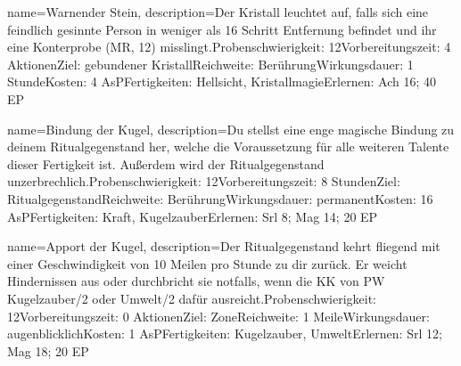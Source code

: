 {
    name={Warnender Stein},
    description={Der Kristall leuchtet auf, falls sich eine feindlich gesinnte Person in weniger als 16 Schritt Entfernung befindet und ihr eine Konterprobe (MR, 12) misslingt.\newline Probenschwierigkeit: 12\newline Vorbereitungszeit: 4 Aktionen\newline Ziel: gebundener Kristall\newline  Reichweite: Berührung\newline Wirkungsdauer: 1 Stunde\newline Kosten: 4 AsP\newline Fertigkeiten: Hellsicht, Kristallmagie\newline Erlernen: Ach 16; 40 EP}
}


{
    name={Bindung der Kugel},
    description={Du stellst eine enge magische Bindung zu deinem Ritualgegenstand her, welche die Voraussetzung für alle weiteren Talente dieser Fertigkeit ist. Außerdem wird der Ritualgegenstand unzerbrechlich.\newline Probenschwierigkeit: 12\newline Vorbereitungszeit: 8 Stunden\newline Ziel: Ritualgegenstand\newline Reichweite: Berührung\newline Wirkungsdauer: permanent\newline Kosten: 16 AsP\newline Fertigkeiten: Kraft, Kugelzauber\newline Erlernen: Srl 8; Mag 14; 20 EP}
}


{
    name={Apport der Kugel},
    description={Der Ritualgegenstand kehrt fliegend mit einer Geschwindigkeit von 10 Meilen pro Stunde zu dir zurück. Er weicht Hindernissen aus oder durchbricht sie notfalls, wenn die KK von PW Kugelzauber/2 oder Umwelt/2 dafür ausreicht.\newline Probenschwierigkeit: 12\newline Vorbereitungszeit: 0 Aktionen\newline Ziel: Zone\newline Reichweite: 1 Meile\newline Wirkungsdauer: augenblicklich\newline Kosten: 1 AsP\newline Fertigkeiten: Kugelzauber, Umwelt\newline Erlernen: Srl 12; Mag 18; 20 EP}
}



